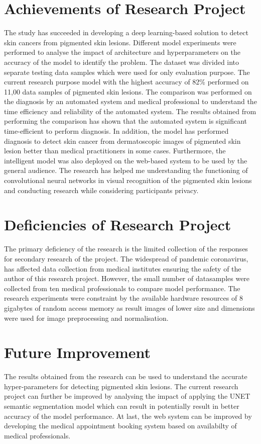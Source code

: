 \section{Achievements of Research Project}
The study has succeeded in developing a deep learning-based solution to detect skin cancers from pigmented skin lesions.
Different model experiments were performed to analyse the impact of architecture and hyperparameters on the accuracy of the model to identify the problem. 
The dataset was divided into separate testing data samples which were used for only evaluation purpose. The current research purpose model with the highest accuracy of 82\% performed on 11,00 data samples of pigmented skin lesions. 
The comparison was performed on the diagnosis by an automated system and medical professional to understand the time efficiency and reliability of the automated system. 
The results obtained from performing the comparison has shown that the automated system is significant time-efficient to perform diagnosis. 
In addition, the model has performed diagnosis to detect skin cancer from dermatoscopic images of pigmented skin lesion better than medical practitioners in some cases.
Furthermore, the intelligent model was also deployed on the web-based system to be used by the general audience. 
The research has helped me understanding the functioning of convolutional neural networks in visual recognition of the pigmented skin lesions
and conducting research while considering participants privacy.

\section{Deficiencies of Research Project}
The primary deficiency of the research is the limited collection of the responses for secondary research of the project. 
The widespread of pandemic coronavirus, has affected data collection from medical institutes ensuring the safety of the author of this research project. 
However, the small number of datasamples were collected from ten medical professionals to compare model performance.
The research experiments were constraint by the available hardware resources of 8 gigabytes of random access memory as result images of lower size and dimensions were used for image preprocessing and normalisation.

\section{Future Improvement}
The results obtained from the research can be used to understand the accurate hyper-parameters for detecting pigmented skin lesions. 
The current research project can further be improved by analysing the impact of applying the UNET semantic segmentation model which can result in potentially result in better accuracy of the model performance.
At last, the web system can be improved by developing the medical appointment booking system based on availabilty of medical professionals.
